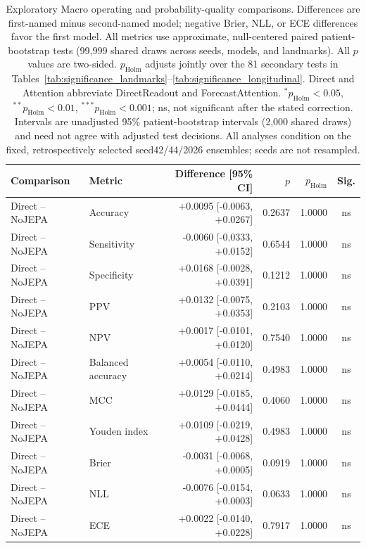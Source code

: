 \begin{table}[t]
\centering
\small
\caption{Exploratory Macro operating and probability-quality comparisons. Differences are first-named minus second-named model; negative Brier, NLL, or ECE differences favor the first model. All metrics use approximate, null-centered paired patient-bootstrap tests (99,999 shared draws across seeds, models, and landmarks). All $p$ values are two-sided. $p_{\mathrm{Holm}}$ adjusts jointly over the 81 secondary tests in Tables~\ref{tab:significance_landmarks}--\ref{tab:significance_longitudinal}. Direct and Attention abbreviate DirectReadout and ForecastAttention. $^{*}p_{\mathrm{Holm}}<0.05$, $^{**}p_{\mathrm{Holm}}<0.01$, $^{***}p_{\mathrm{Holm}}<0.001$; ns, not significant after the stated correction. Intervals are unadjusted 95\% patient-bootstrap intervals (2,000 shared draws) and need not agree with adjusted test decisions. All analyses condition on the fixed, retrospectively selected seed42/44/2026 ensembles; seeds are not resampled.}
\label{tab:significance_extended}
\begin{tabular}{llrrrc}
\toprule
Comparison & Metric & Difference [95\% CI] & $p$ & $p_{\mathrm{Holm}}$ & Sig. \\
\midrule
Direct -- NoJEPA & Accuracy & +0.0095 [-0.0063, +0.0267] & 0.2637 & 1.0000 & ns \\
Direct -- NoJEPA & Sensitivity & -0.0060 [-0.0333, +0.0152] & 0.6544 & 1.0000 & ns \\
Direct -- NoJEPA & Specificity & +0.0168 [-0.0028, +0.0391] & 0.1212 & 1.0000 & ns \\
Direct -- NoJEPA & PPV & +0.0132 [-0.0075, +0.0353] & 0.2103 & 1.0000 & ns \\
Direct -- NoJEPA & NPV & +0.0017 [-0.0101, +0.0120] & 0.7540 & 1.0000 & ns \\
Direct -- NoJEPA & Balanced accuracy & +0.0054 [-0.0110, +0.0214] & 0.4983 & 1.0000 & ns \\
Direct -- NoJEPA & MCC & +0.0129 [-0.0185, +0.0444] & 0.4060 & 1.0000 & ns \\
Direct -- NoJEPA & Youden index & +0.0109 [-0.0219, +0.0428] & 0.4983 & 1.0000 & ns \\
Direct -- NoJEPA & Brier & -0.0031 [-0.0068, +0.0005] & 0.0919 & 1.0000 & ns \\
Direct -- NoJEPA & NLL & -0.0076 [-0.0154, +0.0003] & 0.0633 & 1.0000 & ns \\
Direct -- NoJEPA & ECE & +0.0022 [-0.0140, +0.0228] & 0.7917 & 1.0000 & ns \\

\end{tabular}
\end{table}
